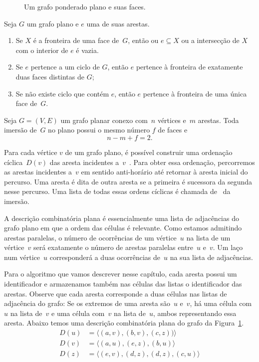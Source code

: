 \begin{figure}[htb]
\scalebox{1.5}{
\centering

}
\caption{Um grafo ponderado plano e suas faces.}
\label{fig:MSF-basico-0}
\end{figure}



\begin{lemma}
\label{lemma:diestel}
Seja $G$ um grafo plano e $e$ uma de suas arestas.
\begin{enumerate}
\item Se $X$ é a fronteira de uma face de~$G$, então ou $e\subseteq X$ ou a intersecção de $X$ com o interior de $e$ é vazia.
\item Se $e$ pertence a um ciclo de $G$, então $e$ pertence à fronteira de exatamente duas faces distintas de $G$;
\item Se não existe ciclo que contém $e$, então $e$ pertence à fronteira de uma única face de~$G$.
\end{enumerate}
\end{lemma}

\begin{theorem}
\label{teo:MSFEuler}
Seja $G=(V,E)$ um grafo planar conexo com~$n$ vértices e~$m$ arestas. Toda imersão de~$G$ no plano possui o mesmo número $f$ de faces e
$$
n-m+f = 2.
$$
\end{theorem}

Para cada vértice $v$ de um grafo plano, é possível construir uma ordenação cíclica~$D(v)$ das aresta incidentes a~$v$~\cite{noma2003}.
Para obter essa ordenação, percorremos as arestas incidentes a~$v$ em sentido anti-horário até retornar à aresta inicial do percurso.
Uma aresta é dita  de outra aresta se a primeira é sucessora da segunda nesse percurso.
Uma lista de todas essas ordens cíclicas é chamada de~ da imersão.

A descrição combinatória plana é essencialmente uma lista de adjacências do grafo plano em que a ordem das células é relevante.
Como estamos admitindo arestas paralelas, o número de ocorrências de um vértice~$u$ na lista de um vértice~$v$ será exatamente o número de arestas paralelas entre~$u$ e~$v$.
Um laço num vértice~$u$ corresponderá a duas ocorrências de~$u$ na sua lista de adjacências.

Para o algoritmo que vamos descrever nesse capítulo, cada aresta possui um identificador e armazenamos também nas células das listas o identificador das arestas.
Observe que cada aresta corresponde a duas células nas listas de adjacência do grafo:
Se os extremos de uma aresta são~$u$ e~$v$, há uma célula com~$u$ na lista de~$v$ e uma célula com~$v$ na lista de~$u$, ambos representando essa aresta.
Abaixo temos uma descrição combinatória plana do grafo da Figura~\ref{fig:MSF-basico-0}.
\begin{align*}
D(u)&=\langle (a,v), (b,v), (c,z))\rangle\\
D(v)&=\langle (a,u), (e,z), (b,u)  \rangle\\
D(z)&=\langle (e,v), (d,z), (d,z), (c,u)\rangle
\end{align*}

